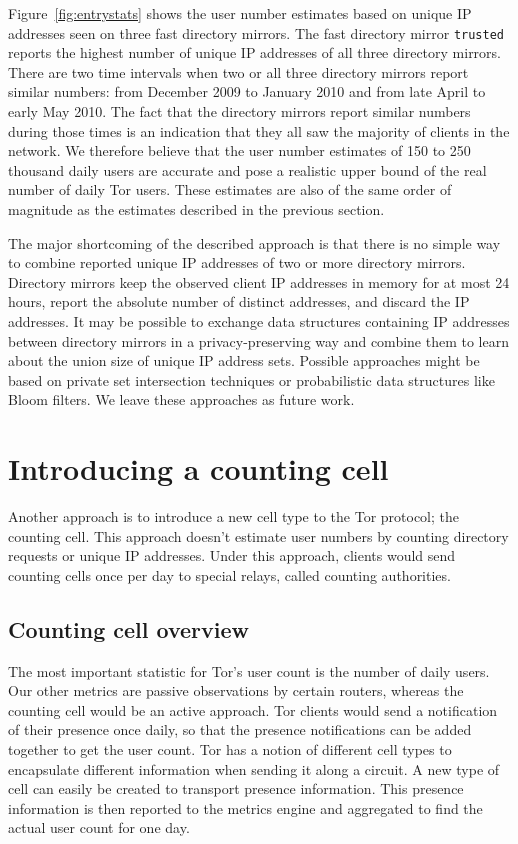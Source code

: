 \documentclass{article}
\begin{document}
Figure~\ref{fig:entrystats} shows the user number estimates
based on unique IP addresses seen on three fast directory mirrors.
The fast directory mirror {\tt trusted} reports the highest number of
unique IP addresses of all three directory mirrors.
There are two time intervals when two or all three directory mirrors
report similar numbers: from December 2009 to January 2010 and from late
April to early May 2010.
The fact that the directory mirrors report similar numbers during those
times is an indication that they all saw the majority of clients in the
network.
We therefore believe that the user number estimates of 150 to 250 thousand
daily users are accurate and pose a realistic upper bound of the real
number of daily Tor users.
These estimates are also of the same order of magnitude as the estimates
described in the previous section.

The major shortcoming of the described approach is that there is no simple
way to combine reported unique IP addresses of two or more directory
mirrors.
Directory mirrors keep the observed client IP addresses in memory for at
most 24 hours, report the absolute number of distinct addresses, and
discard the IP addresses.
It may be possible to exchange data structures containing IP addresses
between directory mirrors in a privacy-preserving way and combine them to
learn about the union size of unique IP address sets.
Possible approaches might be based on private set intersection techniques
or probabilistic data structures like Bloom filters.
We leave these approaches as future work.

\section{Introducing a counting cell}
\label{sec:countingcell}

Another approach is to introduce a new cell type to the Tor protocol; the counting cell.
This approach doesn't estimate user numbers by counting directory
requests or unique IP addresses.
Under this approach, clients would send counting cells once per day to special relays, called
counting authorities.

\subsection{Counting cell overview}
The most important statistic for Tor's user count is the number of daily
users.
Our other metrics are passive observations by certain routers,
whereas the counting cell would be an active approach.
Tor clients would send a notification of their presence once daily, so that
the presence notifications can be added together to get the user count.
Tor has a notion of different cell types to encapsulate different information
when sending it along a circuit.
A new type of cell can easily be created to transport presence information.
This presence information is then reported to the metrics engine and
aggregated to find the actual user count for one day.
\end{document}
